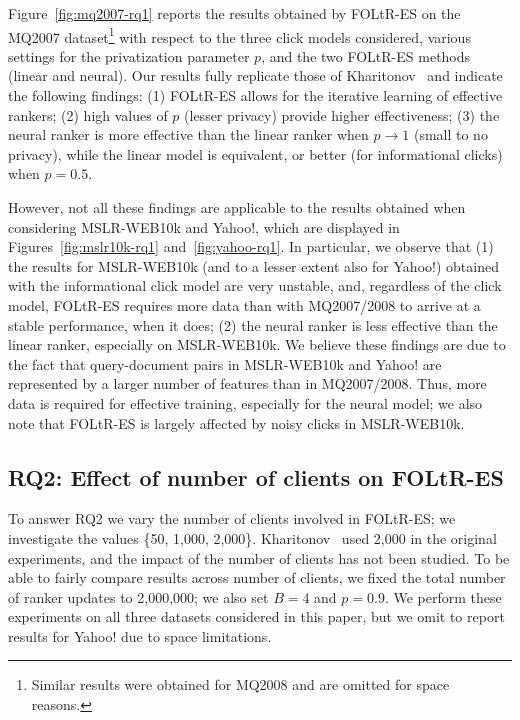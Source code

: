 Figure~\ref{fig:mq2007-rq1} reports the results obtained by FOLtR-ES on the MQ2007 dataset\footnote{Similar results were obtained for MQ2008 and are omitted for space reasons.} with respect to the three click models considered, various settings for the privatization parameter $p$, and the two FOLtR-ES methods (linear and neural). Our results fully replicate those of Kharitonov~\cite{kharitonov2019federated} and indicate the following findings: (1) FOLtR-ES allows for the iterative learning of effective rankers; (2) high values of $p$ (lesser privacy) provide higher effectiveness; 
(3) the neural ranker is more effective than the linear ranker when $p \rightarrow 1$ (small to no privacy), while the linear model is equivalent, or better (for informational clicks) when $p=0.5$. 

However, not all these findings are applicable to the results obtained when considering MSLR-WEB10k and Yahoo!, which are displayed in Figures~\ref{fig:mslr10k-rq1} and~\ref{fig:yahoo-rq1}. In particular, we observe that (1) the results for MSLR-WEB10k (and to a lesser extent also for Yahoo!) obtained with the informational click model are very unstable, and, regardless of the click model, FOLtR-ES requires more data than with MQ2007/2008 to arrive at a stable performance, when it does; (2) the neural ranker is less effective than the linear ranker, especially on MSLR-WEB10k. We believe these findings are due to the fact that query-document pairs in MSLR-WEB10k and Yahoo! are represented by a larger number of features than in MQ2007/2008. Thus, more data is required for effective training, especially for the neural model; we also note that FOLtR-ES is largely affected by noisy clicks in MSLR-WEB10k. 

\subsection{RQ2: Effect of number of clients on FOLtR-ES}
To answer RQ2 we vary the number of clients involved in FOLtR-ES; we investigate the values \{50, 1,000, 2,000\}. Kharitonov~\cite{kharitonov2019federated} used 2,000 in the original experiments, and the impact of the number of clients has not been studied. To be able to fairly compare results across number of clients, we fixed the total number of ranker updates to 2,000,000; we also set $B = 4$ and $p=0.9$. We perform these experiments on all three datasets considered in this paper, but we omit to report results for Yahoo! due to space limitations. 

